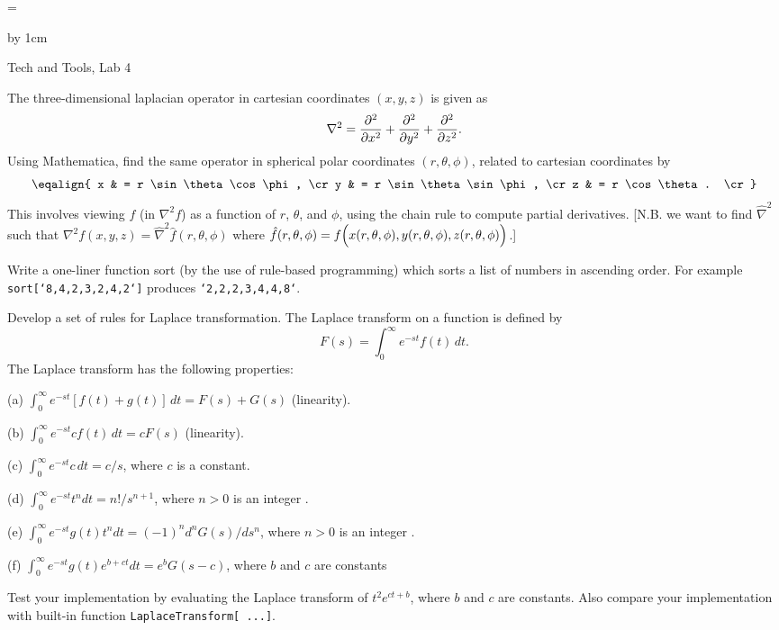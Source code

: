 \magnification=

\advance\vsize by 1cm
\nopagenumbers
\centerline{\titlefont Tech and Tools, Lab 4}
\bigskip
\bigskip
{}
\bigskip
\problem The three-dimensional laplacian operator in cartesian coordinates
$(x,y,z)$ is given as 
$$ \nabla^2  = {\partial^2 \over \partial x^2 } + 
   {\partial^2 \over \partial y^2 } + 
   {\partial^2 \over \partial z^2 }.  $$
Using Mathematica, find the same operator in spherical polar coordinates
$(r, \theta, \phi)$, related to cartesian coordinates by
$$\eqalign{ x & = r \sin\theta \cos\phi, \cr
            y & = r \sin\theta \sin\phi, \cr
            z & = r \cos\theta. \cr}
$$
This involves viewing $f$ (in $\nabla^2 f$) as a function of
$r$, $\theta$, and $\phi$, using the chain rule to compute partial
derivatives.  [N.B. we want to find $\hat \nabla^2$ such
that $\nabla^2 f(x,y,z) = \hat \nabla^2 \hat f(r,\theta,
\phi)$ where $\hat f(r,\theta, \phi) = f\Bigl(x(r,\theta,\phi), 
y(r,\theta,\phi),z(r,\theta,\phi)\Bigr)$.]

\bigskip
\problem Write a one-liner function sort (by the use of rule-based
programming) which sorts a list of numbers in ascending order.
For example {\tt sort[\char`{8,4,2,3,2,4,2\char`}]} produces 
{\tt \char`{2,2,2,3,4,4,8\char`}}.

\bigskip
\problem Develop a set of rules for Laplace transformation.  
The Laplace transform on a function is defined by
$$ F(s) = \int_0^\infty e^{-st} f(t)\,dt.$$
The Laplace transform has the following properties:
\item{} (a) $\int_0^\infty e^{-st}[ f(t) + g(t)]\,dt = F(s) + G(s)$ (linearity).
\item{} (b) $\int_0^\infty e^{-st} c f(t)\,dt = c F(s)$ (linearity).
\item{} (c) $\int_0^\infty e^{-st} c\,dt = c/s$, where $c$ is a constant. 
\item{} (d) $\int_0^\infty e^{-st} t^n dt = n!/s^{n+1}$, where $n>0$ is an integer .
\item{} (e) $\int_0^\infty e^{-st} g(t) t^n dt = (-1)^n {d^n G(s)/ds^n}$, where $n>0$ is an integer .
\item{} (f) $\int_0^\infty e^{-st} g(t) e^{b+ct} dt = e^b G(s-c)$, where $b$ 
and $c$ are constants

\item{} Test your implementation by evaluating the Laplace transform of
$t^2 e^{c t + b}$, where $b$ and $c$ are constants.  Also compare your
implementation with built-in function {\tt LaplaceTransform[ ...]}.

\bye
